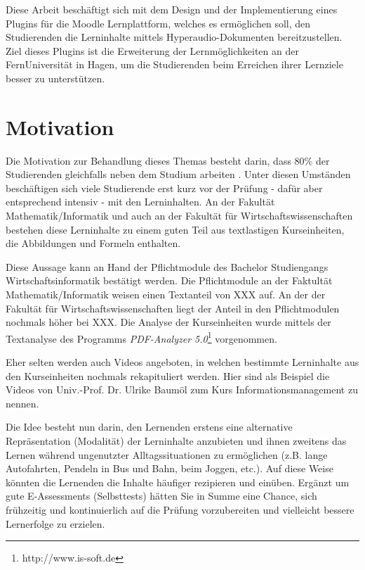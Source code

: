 \label{cha:einfuehrung}
Diese Arbeit beschäftigt sich mit dem Design und der Implementierung eines Plugins für die Moodle Lernplattform, welches es ermöglichen soll, den Studierenden die Lerninhalte mittels Hyperaudio-Dokumenten bereitzustellen. Ziel dieses Plugins ist die Erweiterung der Lernmöglichkeiten an der FernUniversität in Hagen, um die Studierenden beim Erreichen ihrer Lernziele besser zu unterstützen. 

\section{Motivation}
\label{sec:motivation}
Die Motivation zur Behandlung dieses Themas besteht darin, dass 
80\% der Studierenden gleichfalls neben dem Studium arbeiten \citep{fernuniversitaet2018stat}. Unter diesen Umständen beschäftigen sich viele Studierende erst kurz vor der Prüfung - dafür aber entsprechend intensiv - mit den Lerninhalten. An der Fakultät Mathematik/Informatik und auch an der Fakultät für Wirtschaftswissenschaften bestehen diese Lerninhalte zu einem guten Teil aus textlastigen Kurseinheiten, die Abbildungen und Formeln enthalten.


Diese Aussage kann an Hand der Pflichtmodule des Bachelor Studiengangs Wirtschaftsinformatik bestätigt werden.
Die Pflichtmodule an der Faktultät Mathematik/Informatik weisen einen Textanteil von XXX auf. An der der Fakultät für Wirtschaftswissenschaften liegt der Anteil in den Pflichtmodulen nochmals höher bei XXX. Die Analyse der Kurseinheiten wurde mittels der Textanalyse des Programms \textit{PDF-Analyzer 5.0}\footnote{http://www.is-soft.de} vorgenommen.

Eher selten werden auch Videos angeboten, in welchen bestimmte Lerninhalte aus den Kurseinheiten nochmals rekapituliert werden. Hier sind als Beispiel die Videos von Univ.-Prof. Dr. Ulrike Baumöl zum Kurs \glqq Informationsmanagement\grqq{} zu nennen.

Die Idee besteht nun darin, den Lernenden erstens eine alternative Repräsentation (Modalität) der Lerninhalte anzubieten und ihnen zweitens das Lernen während ungenutzter Alltagssituationen zu ermöglichen (z.B. lange Autofahrten, Pendeln in Bus und Bahn, beim Joggen, etc.). Auf diese Weise könnten die Lernenden die Inhalte häufiger rezipieren und einüben. Ergänzt um gute E-Assessments (Selbsttests) hätten Sie in Summe eine Chance, sich frühzeitig und kontinuierlich auf die Prüfung vorzubereiten und vielleicht bessere Lernerfolge zu erzielen. 


